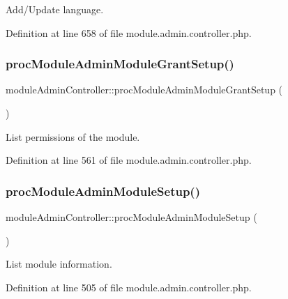 Add/\+Update language. 



Definition at line 658 of file module.\+admin.\+controller.\+php.

\hypertarget{classmoduleAdminController_aab0e773fbdbac7faf7e0073aeb94b77d}{}\label{classmoduleAdminController_aab0e773fbdbac7faf7e0073aeb94b77d} 
\subsubsection{\texorpdfstring{proc\+Module\+Admin\+Module\+Grant\+Setup()}{procModuleAdminModuleGrantSetup()}}
{\footnotesize\ttfamily module\+Admin\+Controller\+::proc\+Module\+Admin\+Module\+Grant\+Setup (\begin{DoxyParamCaption}{ }\end{DoxyParamCaption})}



List permissions of the module. 



Definition at line 561 of file module.\+admin.\+controller.\+php.

\hypertarget{classmoduleAdminController_a7a4a202f2249823182f5aab39709f45e}{}\label{classmoduleAdminController_a7a4a202f2249823182f5aab39709f45e} 
\subsubsection{\texorpdfstring{proc\+Module\+Admin\+Module\+Setup()}{procModuleAdminModuleSetup()}}
{\footnotesize\ttfamily module\+Admin\+Controller\+::proc\+Module\+Admin\+Module\+Setup (\begin{DoxyParamCaption}{ }\end{DoxyParamCaption})}



List module information. 



Definition at line 505 of file module.\+admin.\+controller.\+php.

